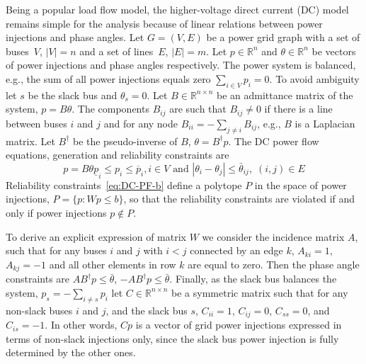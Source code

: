 Being a popular load flow model, the higher-voltage direct current (DC) model remains simple for the analysis because of linear relations between power injections and phase angles. Let $G = (V, E)$ be a power grid graph with a set of buses~$V$, $|V| = n$ and a set of lines~$E$, $|E| = m$. Let $p \in \mathbb{R}^{n}$ and $\theta\in\mathbb{R}^{n}$ be vectors of power injections and phase angles respectively.  The power system is balanced, e.g., the sum of all power injections equals zero $\sum_{i \in V} p_i = 0$. To avoid ambiguity let $s$ be the slack bus and $\theta_s = 0.$ Let $B \in \mathbb{R}^{n \times n}$ be an admittance matrix of the system, $p = B\theta$. The components $B_{ij}$ are such that $B_{ij} \neq 0$ if there is a line between buses $i$ and $j$ and  for any node $B_{ii} = - \sum_{j\neq i} B_{ij}$, e.g., $B$ is a Laplacian matrix.  Let $B^{\dagger}$ be the pseudo-inverse of $B$, $\theta = B^{\dagger} p$. The DC power flow equations, generation and reliability constraints are 
\begin{subequations}
\label{eq:DC-PF}
    \begin{equation}
        p = B \theta
        \label{eq:DC-PF-a}
    \end{equation}
    \begin{equation}
        \underline{p}_i \leq p_i \leq \overline{p}_i
        \label{eq:DC-PF-b}, i \in V \text{ and } |\theta_i - \theta_j| \leq \bar{\theta}_{ij}, \; (i,j)\in E
    \end{equation}
\end{subequations}
Reliability constraints~\eqref{eq:DC-PF-b} %
define a polytope $P$ in the space of power injections, $P = \{p: W p \le b\}$, so that the reliability constraints are violated if and only if power injections $p \not\in P.$ 

To derive an explicit expression of matrix $W$ we consider the incidence matrix $A$, such that for any buses $i$ and $j$ with $i<j$ connected by an edge $k$, $A_{ki} = 1$, $A_{kj} = -1$ and all other elements in row $k$ are equal to zero. Then the phase angle constraints are $AB^{\dagger}p \le \bar\theta$, $-AB^{\dagger}p \le \bar\theta$. 
%
Finally, as the slack bus balances the system, $p_s = -\sum_{i\neq s} p_i$ let $C \in \mathbb{R}^{n\times n}$ be a symmetric matrix such that for any non-slack buses $i$ and $j$, and the slack bus $s$, $C_{ii} = 1$, $C_{ij} = 0$, $C_{ss}=0$, and $C_{is} = -1$. In other words, $C p$ is a vector of grid power injections expressed in terms of non-slack injections only, since the slack bus power injection is fully determined by the other ones. 


